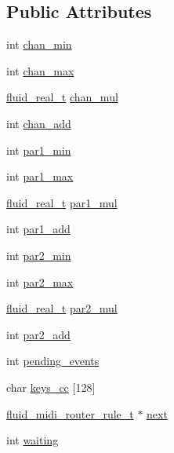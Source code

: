 \subsection*{Public Attributes}
\begin{DoxyCompactItemize}
\item 
int \hyperlink{struct__fluid__midi__router__rule__t_aadf5431504c54c40513f452d6237a2bc}{chan\+\_\+min}
\item 
int \hyperlink{struct__fluid__midi__router__rule__t_a8aa14e2015ca095555b90b5357a18cad}{chan\+\_\+max}
\item 
\hyperlink{fluidsynth__priv_8h_a9e96f0917747b69cabb7c671bc693dbb}{fluid\+\_\+real\+\_\+t} \hyperlink{struct__fluid__midi__router__rule__t_af6697cf8e4b7f0642a39a50a271f2a83}{chan\+\_\+mul}
\item 
int \hyperlink{struct__fluid__midi__router__rule__t_a9ce72ef138372a30276571c55cadfcf8}{chan\+\_\+add}
\item 
int \hyperlink{struct__fluid__midi__router__rule__t_a92c33319629db070a96c5bc6248ace87}{par1\+\_\+min}
\item 
int \hyperlink{struct__fluid__midi__router__rule__t_a1a5d782a778bc5ed101f03579b1ff620}{par1\+\_\+max}
\item 
\hyperlink{fluidsynth__priv_8h_a9e96f0917747b69cabb7c671bc693dbb}{fluid\+\_\+real\+\_\+t} \hyperlink{struct__fluid__midi__router__rule__t_abfbb68837d8abbbbf1b3fb1424d0b55a}{par1\+\_\+mul}
\item 
int \hyperlink{struct__fluid__midi__router__rule__t_a8806fc630d5616ebb379fb1eaadea810}{par1\+\_\+add}
\item 
int \hyperlink{struct__fluid__midi__router__rule__t_a4c36d5d887318cd57a0b1bc54724aaac}{par2\+\_\+min}
\item 
int \hyperlink{struct__fluid__midi__router__rule__t_a942f2306124a3a5bfd79c77ec8b03132}{par2\+\_\+max}
\item 
\hyperlink{fluidsynth__priv_8h_a9e96f0917747b69cabb7c671bc693dbb}{fluid\+\_\+real\+\_\+t} \hyperlink{struct__fluid__midi__router__rule__t_a9e5bbdfe4cde9537a02b9c2d462a86c7}{par2\+\_\+mul}
\item 
int \hyperlink{struct__fluid__midi__router__rule__t_a27dee95b2b9ebcee9368276c2cb80479}{par2\+\_\+add}
\item 
int \hyperlink{struct__fluid__midi__router__rule__t_a43426ac203b64f9eb6ffb616afd5e6bc}{pending\+\_\+events}
\item 
char \hyperlink{struct__fluid__midi__router__rule__t_a3793f03a674079324ea77dda155b2990}{keys\+\_\+cc} \mbox{[}128\mbox{]}
\item 
\hyperlink{types_8h_a3154253ddb8f9b8f8f737c91f5973278}{fluid\+\_\+midi\+\_\+router\+\_\+rule\+\_\+t} $\ast$ \hyperlink{struct__fluid__midi__router__rule__t_a3967c58266f5695bd38046dd98dddfbd}{next}
\item 
int \hyperlink{struct__fluid__midi__router__rule__t_a1bf6b0e05953518ee7270861a2965082}{waiting}
\end{DoxyCompactItemize}


